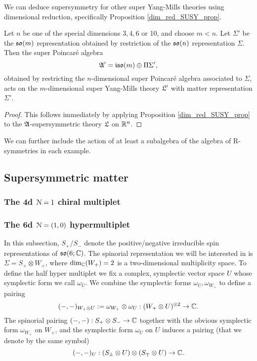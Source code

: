 \documentclass[10pt, oneside]{article}
\begin{document}
We can deduce supersymmetry for other super Yang-Mills theories using dimensional reduction, specifically Proposition \ref{dim_red_SUSY_prop}.
\begin{corollary}
Let $n$ be one of the special dimensions $3,4,6$ or 10, and choose $m < n$.  Let $\Sigma'$ be the $\mathfrak{so}(m)$ representation obtained by restriction of the $\mathfrak{so}(n)$ representation $\Sigma$.  Then the super Poincar\'e algebra
\[\mathfrak{A}' = \mathfrak{iso}(m) \oplus \Pi \Sigma',\]
obtained by restricting the $n$-dimensional super Poincar\'e algebra associated to $\Sigma$, acts on the $m$-dimensional super Yang-Mills theory $\mathfrak{L}'$ with matter representation $\Sigma'$.
\end{corollary}

\begin{proof}
This follows immediately by applying Proposition \ref{dim_red_SUSY_prop} to the $\mathfrak{A}$-supersymmetric theory $\mathfrak{L}$ on $\mathbb R^n$.
\end{proof}

\begin{remark}
We can further include the action of at least a subalgebra of the algebra of R-symmetries in each example. 
\end{remark}

\subsection{Supersymmetric matter}

\subsubsection{The 4d $\mathcal N=1$ chiral multiplet}


\subsubsection{The 6d $\mathcal N=(1, 0)$ hypermultiplet}

In this subsection, $S_+ / S_-$ denote the positive/negative irreducible spin representations of $\mathfrak{so}(6; \mathbb C)$. 
The spinorial representation we will be interested in is $\Sigma = S_+ \otimes W_+$, where $\dim_{\mathbb C}(W_+) = 2$ is a two-dimensional multiplicity space. 
To define the half hyper multiplet we fix a complex, symplectic vector space $U$ whose symplectic form we call $\omega_U$.
We combine the symplectic forms $\omega_U, \omega_{W_+}$ to define a pairing 
\[
(-,-)_{W_+ \otimes U}  := \omega_{W_+} \otimes \omega_U : (W_+ \otimes U)^{\otimes 2} \to \mathbb C .
\]
The spinorial pairing $(-,-) : S_+ \otimes S_- \to \mathbb C$ together with the obvious symplectic form $\omega_{W_+}$ on $W_+$, and the symplectic form $\omega_U$ on $U$ induces a pairing (that we denote by the same symbol)
\[
(-,-)_U : (S_\pm \otimes U) \otimes (S_\mp \otimes U) \to \mathbb C .
\]
\end{document}
